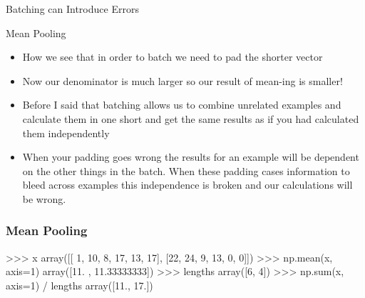 \documentclass{beamer}
\begin{document}
\begin{section}{Batching can Introduce Errors}
\begin{subsection}{Mean Pooling}
\begin{frame}
{\begin{itemize}
                    \item<3-> How we see that in order to batch we need to pad the shorter vector
                    \item<3-> Now our denominator is much larger so our result of mean-ing is smaller!
                    \item<3-> Before I said that batching allows us to combine unrelated examples and calculate them in
                        one short and get the same results as if you had calculated them independently
                    \item<3-> When your padding goes wrong the results for an example will be dependent on the other
                        things in the batch. When these padding cases information to bleed across examples this
                        independence is broken and our calculations will be wrong.
                \end{itemize}
            }
        \end{frame}

\begin{frame}[fragile]
    \frametitle{Mean Pooling}

    \begin{pythoncode}
            >>> x
            array([[ 1, 10,  8, 17, 13, 17],
                   [22, 24,  9, 13,  0,  0]])
            >>> np.mean(x, axis=1)
            array([11.        , 11.33333333])
            >>> lengths
            array([6, 4])
            >>> np.sum(x, axis=1) / lengths
            array([11., 17.])
    \end{pythoncode}


\end{frame}
\end{subsection}
\end{section}
\end{document}
